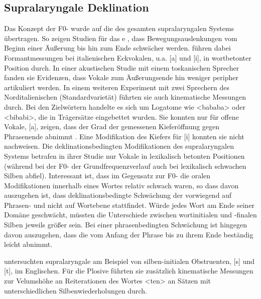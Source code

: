 \subsection{Supralaryngale Deklination}
\label{subsec:050302}

Das Konzept der F0- wurde auf die  des gesamten supralaryngalen Systems übertragen. So zeigen Studien für das e \citep{Vayra1992}, dass Bewegungsauslenkungen vom Beginn einer Äußerung bis hin zum Ende schwächer werden. \citet{Vayra1992} führen dabei Formantmessungen bei italienischen Eckvokalen, u.a. [a] und [i], in wortbetonter Position durch. In einer akustischen Studie mit einem toskanischen Sprecher fanden sie Evidenzen, dass Vokale zum Äußerungsende hin weniger peripher artikuliert werden. In einem weiteren Experiment mit zwei Sprechern des Norditalienischen (Standardvarietät) führten sie auch kinematische Messungen durch. Bei den Zielwörtern handelte es sich um Logatome wie <bababa> oder <bibabi>, die in Trägersätze eingebettet wurden. Sie konnten nur für offene Vokale, [a], zeigen, dass der Grad der  gemessenen Kieferöffnung gegen Phrasenende abnimmt \citep[supralaryngeal weakening,][]{Vayra1992}. Eine Modifikation des Kiefers für [i] konnten sie nicht nachweisen. Die deklinationsbedingten Modifikationen des supralaryngalen Systems betrafen in ihrer Studie nur Vokale in lexikalisch betonten Positionen (während bei der F0- der Grundfrequenzverlauf auch bei lexikalisch schwachen Silben abfiel). Interessant ist, dass im Gegensatz zur F0- die oralen Modifikationen innerhalb eines Wortes relativ schwach waren, so dass davon auszugehen ist, dass deklinationsbedingte Schwächung der  vorwiegend auf Phrasen- und nicht auf Wortebene stattfindet. Würde jedes Wort am Ende seiner Domäne geschwächt, müssten die Unterschiede zwischen wortinitialen und -finalen Silben jeweils größer sein. Bei einer phrasenbedingten Schwächung ist hingegen davon auszugehen, dass die  vom Anfang der Phrase bis zu ihrem Ende beständig leicht abnimmt.

\citet{Krakow1995} untersuchten supralaryngale  am Beispiel von silben-initialen Obstruenten, [s] und [t], im Englischen. Für die Plosive führten sie zusätzlich kinematische Messungen zur Velumshöhe an Reiterationen des Wortes <ten> an Sätzen mit unterschiedlichen Silbenwiederholungen durch.

